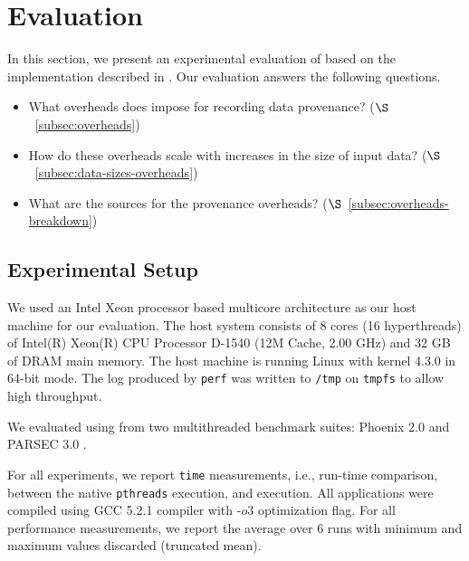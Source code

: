 \section{Evaluation}
\label{sec:evaluation}

In this section, we present an experimental evaluation of \projecttitle based on the implementation described in  . Our evaluation answers the following questions.

\begin{itemize}
\item What overheads does \projecttitle impose for recording data provenance? ($\S$~\ref{subsec:overheads})
\item How do these overheads scale with increases in the size of input data? ($\S$~\ref{subsec:data-sizes-overheads})
\item What are the sources for the provenance overheads? ($\S$~\ref{subsec:overheads-breakdown})
\end{itemize}



\subsection{Experimental Setup}


 We used an Intel Xeon processor based
multicore architecture as our host machine for our evaluation. The
host system consists of 8 cores (16 hyperthreads) of Intel(R) Xeon(R) CPU Processor D-1540
(12M Cache, 2.00 GHz) and 32 GB of DRAM main memory. The host
machine is running Linux with kernel 4.3.0 in 64-bit mode. The log produced by
{\tt perf} was written to {\tt /tmp} on {\tt tmpfs} to allow high throughput.


  We evaluated \projecttitle using from two multithreaded benchmark suites: Phoenix 2.0 \cite{phoenix} and PARSEC 3.0 \cite{parsec}. %


  For all experiments,  we report {\tt time}
measurements, i.e., run-time comparison, between the native {\tt pthreads}
execution, and \projecttitle execution.  All applications were compiled using
GCC 5.2.1 compiler with -$o3$ optimization flag. For all performance
measurements, we report the average over 6 runs with minimum and maximum values
discarded (truncated mean).

